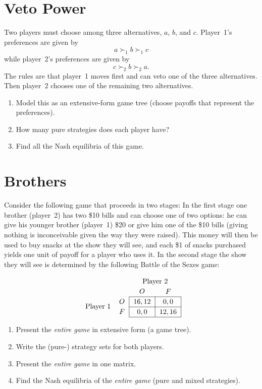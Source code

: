 \documentclass[12pt,a4paper]{article}
\begin{document}
\section{Veto Power}
Two players must choose among three alternatives, $a$, $b$, and $c$.
Player~1's preferences are given by
\[
a \succ_1 b \succ_1 c
\]
while player~2's preferences are given by
\[
c \succ_2 b \succ_2 a.
\]
The rules are that player~1 moves first and can veto one of the three alternatives.
Then player~2 chooses one of the remaining two alternatives.

\begin{enumerate}[label=\alph*.]
    \item Model this as an extensive-form game tree (choose payoffs that represent the preferences).
    \item How many pure strategies does each player have?
    \item Find all the Nash equilibria of this game.
\end{enumerate}

\section{Brothers}
Consider the following game that proceeds in two stages:
In the first stage one brother (player~2) has two \$10 bills and can choose one of two options:
he can give his younger brother (player~1) \$20 or give him one of the \$10 bills
(giving nothing is inconceivable given the way they were raised).
This money will then be used to buy snacks at the show they will see, and each \$1 of snacks purchased yields one unit of payoff for a player who uses it.
In the second stage the show they will see is determined by the following Battle of the Sexes game:

\[
\setlength{\arraycolsep}{6pt}
\renewcommand{\arraystretch}{1.2}
\begin{array}{c c c c}
    & & \multicolumn{2}{c}{\text{Player 2}} \\
    & & O & F \\
    \cline{3-4}
    \multirow{2}{*}{\text{Player 1}} & O
    & \multicolumn{1}{|c|}{16,12} & \multicolumn{1}{c|}{0,0} \\
    \cline{3-4}
    & F
    & \multicolumn{1}{|c|}{0,0} & \multicolumn{1}{c|}{12,16} \\
    \cline{3-4}
\end{array}
\]

\begin{enumerate}[label=\alph*.]
    \item Present the \emph{entire game} in extensive form (a game tree).
    \item Write the (pure-) strategy sets for both players.
    \item Present the \emph{entire game} in one matrix.
    \item Find the Nash equilibria of the \emph{entire game} (pure and mixed strategies).
\end{enumerate}
\end{document}
